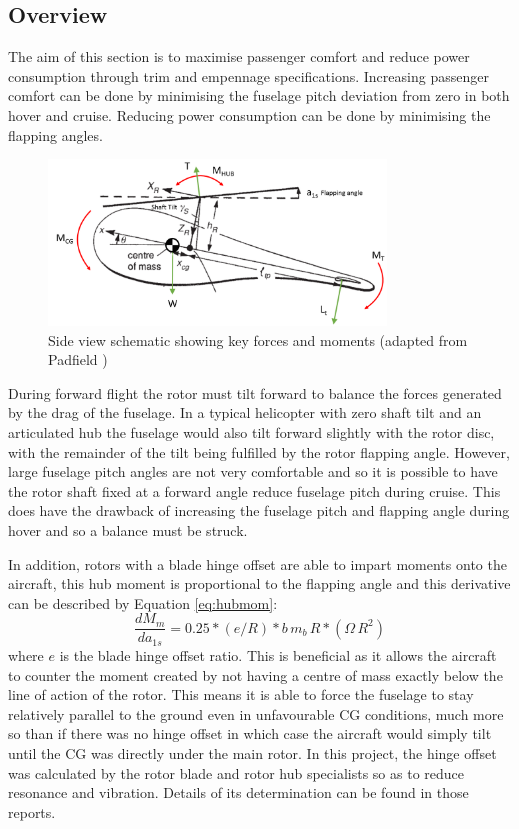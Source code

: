 \documentclass[11pt,a4paper]{article}
\begin{document}
\subsection{Overview}
The aim of this section is to maximise passenger comfort and reduce power consumption through trim and empennage specifications. Increasing passenger comfort can be done by minimising the fuselage pitch deviation from zero in both hover and cruise. Reducing power consumption can be done by minimising the flapping angles.
\begin{figure}[H]
    \centering
    \includegraphics[width=0.8\textwidth]{FBD.PNG}
    \caption{Side view schematic showing key forces and moments (adapted from Padfield \cite{padfield})}
    \label{fig:fbd}
\end{figure}{}

During forward flight the rotor must tilt forward to balance the forces generated by the drag of the fuselage.
In a typical helicopter with zero shaft tilt and an articulated hub the fuselage would also tilt forward slightly with the rotor disc, with the remainder of the tilt being fulfilled by the rotor flapping angle. 
However, large fuselage pitch angles are not very comfortable and so it is possible to have the rotor shaft fixed at a forward angle reduce fuselage pitch during cruise. This does have the drawback of increasing the fuselage pitch and flapping angle during hover and so a balance must be struck.

In addition, rotors with a blade hinge offset are able to impart moments onto the aircraft, this hub moment is proportional to the flapping angle and this derivative can be described by Equation \ref{eq:hubmom}:
\begin{equation}
    \frac{dM_m}{da_{1s}}=0.25*(e/R)*b\,m_b\,R*(\Omega\,R^2) \label{eq:hubmom}
\end{equation}{}
where $e$ is the blade hinge offset ratio\cite{prouty}.
This is beneficial as it allows the aircraft to counter the moment created by not having a centre of mass exactly below the line of action of the rotor. This means it is able to force the fuselage to stay relatively parallel to the ground even in unfavourable CG conditions, much more so than if there was no hinge offset in which case the aircraft would simply tilt until the CG was directly under the main rotor. In this project, the hinge offset was calculated by the rotor blade and rotor hub specialists so as to reduce resonance and vibration. Details of its determination can be found in those reports.
\end{document}

